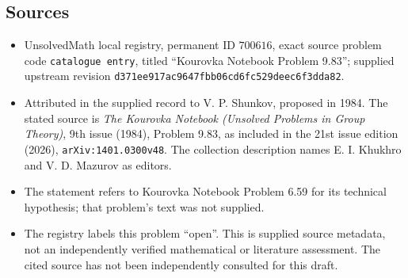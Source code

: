 \documentclass[11pt]{article}
\begin{document}
\subsection{Sources}
\begin{itemize}
\item UnsolvedMath local registry, permanent ID \(700616\), exact source problem code \texttt{catalogue entry}, titled ``Kourovka Notebook Problem 9.83''; supplied upstream revision \texttt{d371ee917ac9647fbb06cd6fc529deec6f3dda82}.
\item Attributed in the supplied record to V. P. Shunkov, proposed in 1984. The stated source is \emph{The Kourovka Notebook (Unsolved Problems in Group Theory)}, 9th issue (1984), Problem 9.83, as included in the 21st issue edition (2026), \texttt{arXiv:1401.0300v48}. The collection description names E. I. Khukhro and V. D. Mazurov as editors.
\item The statement refers to Kourovka Notebook Problem 6.59 for its technical hypothesis; that problem's text was not supplied.
\item The registry labels this problem ``open''. This is supplied source metadata, not an independently verified mathematical or literature assessment. The cited source has not been independently consulted for this draft.
\end{itemize}
\end{document}
